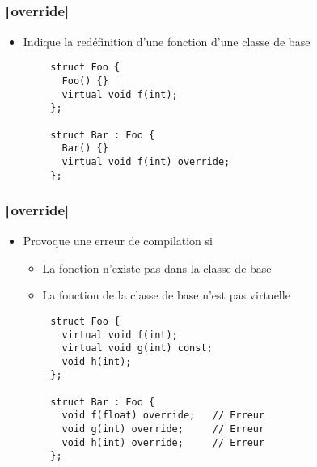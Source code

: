 \documentclass[C++.tex]{subfiles}
\begin{document}
\begin{frame}[fragile]
	\frametitle{\texttt|override|}
	\begin{itemize}
		\item Indique la redéfinition d'une fonction d'une classe de base
	\end{itemize}

	\begin{verbatim}
		struct Foo {
		  Foo() {}
		  virtual void f(int);
		};

		struct Bar : Foo {
		  Bar() {}
		  virtual void f(int) override;
		};
	\end{verbatim}
\end{frame}

\begin{frame}[fragile]
	\frametitle{\texttt|override|}
	\begin{itemize}
		\item Provoque une erreur de compilation si
		\begin{itemize}
			\item La fonction n'existe pas dans la classe de base
			\item La fonction de la classe de base n'est pas virtuelle
		\end{itemize}
	\end{itemize}

	\begin{verbatim}
		struct Foo {
		  virtual void f(int); 
		  virtual void g(int) const;
		  void h(int);
		};

		struct Bar : Foo {
		  void f(float) override;   // Erreur 
		  void g(int) override;     // Erreur
		  void h(int) override;     // Erreur
		};
	\end{verbatim}


\end{frame}
\end{document}
